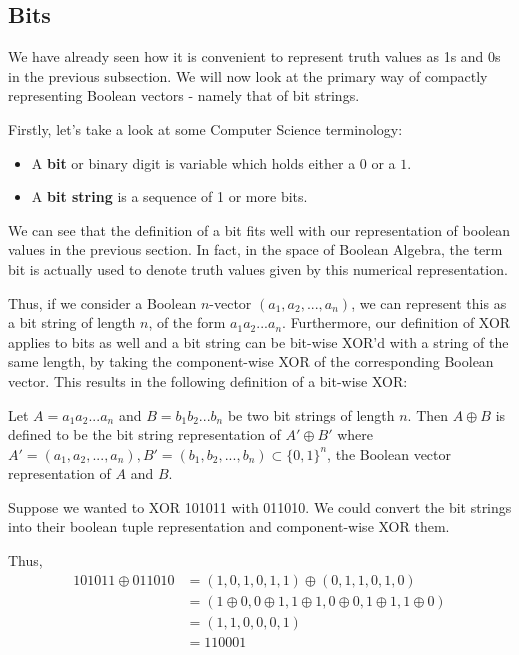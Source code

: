 \subsection{Bits}
We have already seen how it is convenient to represent truth values as 1s
and 0s in the previous subsection. We will now look at the primary way of
compactly representing Boolean vectors - namely that of bit strings.

Firstly, let's take a look at some Computer Science terminology:
\begin{itemize}
\item A \textbf{bit} or binary digit is variable which holds either a $0$ or a $1$.
\item A \textbf{bit string} is a sequence of 1 or more bits.
\end{itemize}

We can see that the definition of a bit fits well with our representation of
boolean values in the previous section. In fact, in the space of Boolean
Algebra, the term bit is actually used to denote truth values given by this 
numerical representation.

Thus, if we consider a Boolean $n$-vector $(a_1, a_2, ..., a_n)$, we
can represent this as a bit string of length $n$, of the form $a_1a_2...a_n$.
Furthermore, our definition of XOR applies to bits as well and a bit string can
be bit-wise XOR'd with a string of the same length, by taking the
component-wise XOR of the corresponding Boolean vector. This results in the
following definition of a bit-wise XOR:

\begin{defn}
Let $A = a_1a_2...a_n$ and $B = b_1b_2...b_n$ be two bit strings of length $n$. 
Then $A \oplus B$ is defined to be the bit string representation of 
$A' \oplus B'$ where $A' = (a_1, a_2, ..., a_n), B' = (b_1, b_2, ..., b_n) \subset \{0,1\}^n$,
the Boolean vector representation of $A$ and $B$.

\end{defn}

\begin{example}
Suppose we wanted to XOR 101011 with 011010. We could convert the bit strings
into their boolean tuple representation and component-wise XOR them. 

Thus, 
\begin{align*}
101011 \oplus 011010 
                     &= (1, 0, 1, 0, 1, 1) \oplus (0, 1, 1, 0, 1, 0)\\ 
                     &= (1 \oplus 0, 0 \oplus 1, 1 \oplus 1, 0 \oplus 0, 1 \oplus 1, 1 \oplus 0)\\
                     &= (1, 1, 0, 0, 0, 1)\\
                     &= 110001
\end{align*}
\end{example}

